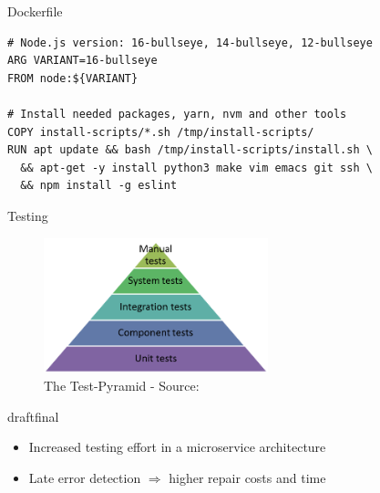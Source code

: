 \documentclass{beamer}
\def\final{final}
\def\status{draft}
\begin{document}
\begin{frame}[fragile]{Dockerfile}
  \begin{lstlisting}[language=docker, frame=single, basicstyle=\footnotesize, caption={NodeJS DevContainer Dockerfile},label=code::docker_dev_node]
# Node.js version: 16-bullseye, 14-bullseye, 12-bullseye
ARG VARIANT=16-bullseye
FROM node:${VARIANT}

# Install needed packages, yarn, nvm and other tools
COPY install-scripts/*.sh /tmp/install-scripts/
RUN apt update && bash /tmp/install-scripts/install.sh \
  && apt-get -y install python3 make vim emacs git ssh \
  && npm install -g eslint
      \end{lstlisting}
\end{frame}


\begin{frame}{}
  \vspace{-0.5cm}
  \begin{center}
    \Large Testing
  \end{center}

  \vspace{-0.5cm}
  \begin{figure}
    \includegraphics[width=0.58\textwidth]{img/tests-pyramid.png}
    \caption{\footnotesize The Test-Pyramid - \textcolor{uos-grey-full}{Source: {\cite{microtest}}}}
  \end{figure}
  \vspace{-0.2cm}

  \ifx\status\final{}
    \pause{}
  \fi


  \begin{block}{}
    \begin{itemize}
      \small
      \setlength\itemsep{0em}
      \item Increased testing effort in a microservice architecture
      \item Late error detection \(\Rightarrow \) higher repair costs and time
    \end{itemize}
  \end{block}
\end{frame}
\end{document}
